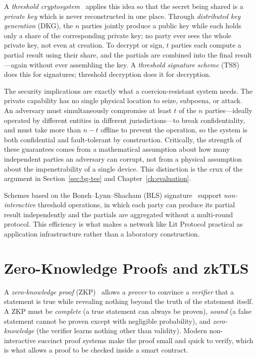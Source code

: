 A \emph{threshold cryptosystem}~\cite{desmedt1989, nistThreshold} applies this
idea so that the secret being shared is a \emph{private key} which is never
reconstructed in one place. Through \emph{distributed key generation} (DKG), the
$n$ parties jointly produce a public key while each holds only a share of the
corresponding private key; no party ever sees the whole private key, not even at
creation. To decrypt or sign, $t$ parties each compute a partial result using
their share, and the partials are combined into the final result---again without
ever assembling the key. A \emph{threshold signature scheme} (TSS) does this for
signatures; threshold decryption does it for decryption.

The security implications are exactly what a coercion-resistant system needs.
The private capability has no single physical location to seize, subpoena, or
attack. An adversary must simultaneously compromise at least $t$ of the $n$
parties---ideally operated by different entities in different
jurisdictions---to break confidentiality, and must take more than $n - t$ offline
to prevent the operation, so the system is both confidential and fault-tolerant
by construction. Critically, the strength of these guarantees comes from a
mathematical assumption about how many independent parties an adversary can
corrupt, not from a physical assumption about the impenetrability of a single
device. This distinction is the crux of the argument in
Section~\ref{sec:bg-tee} and Chapter~\ref{ch:evaluation}.

Schemes based on the Boneh--Lynn--Shacham (BLS) signature~\cite{boneh2001bls}
support \emph{non-interactive} threshold operations, in which each party can
produce its partial result independently and the partials are aggregated without
a multi-round protocol. This efficiency is what makes a network like Lit
Protocol practical as application infrastructure rather than a laboratory
construction.

\section{Zero-Knowledge Proofs and zkTLS}
\label{sec:bg-zk}

A \emph{zero-knowledge proof} (ZKP)~\cite{goldwasser1989} allows a \emph{prover}
to convince a \emph{verifier} that a statement is true while revealing nothing
beyond the truth of the statement itself. A ZKP must be \emph{complete} (a true
statement can always be proven), \emph{sound} (a false statement cannot be proven
except with negligible probability), and \emph{zero-knowledge} (the verifier
learns nothing other than validity). Modern non-interactive succinct proof
systems make the proof small and quick to verify, which is what allows a proof to
be checked inside a smart contract.

